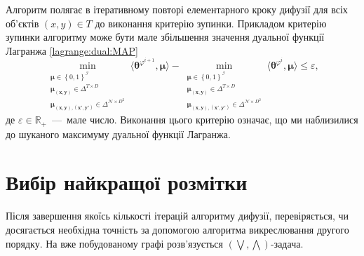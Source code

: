 
Алгоритм полягає в ітеративному повторі елементарного кроку дифузії для всіх об'єктів
$\left(x, y \right) \in T$ до виконання критерію зупинки.
Прикладом критерію зупинки алгоритму може бути мале збільшення
значення дуальної функції Лагранжа \eqref{lagrange:dual:MAP}
\begin{equation*}
    \min \limits_{\substack{\pmb{\mu} \in \left\{ 0, 1 \right\}^{\mathcal{I}} \\
                            \pmb{\mu_{\left(x, y \right)}} \in \Delta^{T \times D} \\
                            \pmb{\mu_{\left(x, y \right), \left(x', y' \right)}} \in
                                \Delta^{\mathcal{N} \times D^2}}}
        \langle \pmb{\theta}^{\varphi^{i + 1}}, \pmb{\mu} \rangle -
    \min \limits_{\substack{\pmb{\mu} \in \left\{ 0, 1 \right\}^{\mathcal{I}} \\
                            \pmb{\mu_{\left(x, y \right)}} \in \Delta^{T \times D} \\
                            \pmb{\mu_{\left(x, y \right), \left(x', y' \right)}} \in
                                \Delta^{\mathcal{N} \times D^2}}}
        \langle \pmb{\theta}^{\varphi^i}, \pmb{\mu} \rangle \le \varepsilon,
\end{equation*}
де $\varepsilon \in \mathbb{R}_+$~---~мале число.
Виконання цього критерію означає,
що ми наблизилися до шуканого максимуму дуальної функції Лагранжа.

\section{Вибір найкращої розмітки}


Після завершення якоїсь кількості ітерацій алгоритму дифузії,
перевіряється, чи досягається необхідна точність за допомогою
алгоритма викреслювання другого порядку.
На вже побудованому графі розв'язується
$\left( \bigvee, \bigwedge \right)$-задача.

